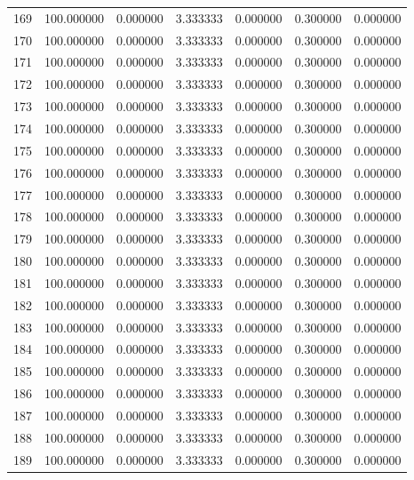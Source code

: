 \begin{tabular}{rrrrrrr}
169 & 100.000000 &    0.000000 &  3.333333 &   0.000000 &   0.300000 &  0.000000 \\
170 & 100.000000 &    0.000000 &  3.333333 &   0.000000 &   0.300000 &  0.000000 \\
171 & 100.000000 &    0.000000 &  3.333333 &   0.000000 &   0.300000 &  0.000000 \\
172 & 100.000000 &    0.000000 &  3.333333 &   0.000000 &   0.300000 &  0.000000 \\
173 & 100.000000 &    0.000000 &  3.333333 &   0.000000 &   0.300000 &  0.000000 \\
174 & 100.000000 &    0.000000 &  3.333333 &   0.000000 &   0.300000 &  0.000000 \\
175 & 100.000000 &    0.000000 &  3.333333 &   0.000000 &   0.300000 &  0.000000 \\
176 & 100.000000 &    0.000000 &  3.333333 &   0.000000 &   0.300000 &  0.000000 \\
177 & 100.000000 &    0.000000 &  3.333333 &   0.000000 &   0.300000 &  0.000000 \\
178 & 100.000000 &    0.000000 &  3.333333 &   0.000000 &   0.300000 &  0.000000 \\
179 & 100.000000 &    0.000000 &  3.333333 &   0.000000 &   0.300000 &  0.000000 \\
180 & 100.000000 &    0.000000 &  3.333333 &   0.000000 &   0.300000 &  0.000000 \\
181 & 100.000000 &    0.000000 &  3.333333 &   0.000000 &   0.300000 &  0.000000 \\
182 & 100.000000 &    0.000000 &  3.333333 &   0.000000 &   0.300000 &  0.000000 \\
183 & 100.000000 &    0.000000 &  3.333333 &   0.000000 &   0.300000 &  0.000000 \\
184 & 100.000000 &    0.000000 &  3.333333 &   0.000000 &   0.300000 &  0.000000 \\
185 & 100.000000 &    0.000000 &  3.333333 &   0.000000 &   0.300000 &  0.000000 \\
186 & 100.000000 &    0.000000 &  3.333333 &   0.000000 &   0.300000 &  0.000000 \\
187 & 100.000000 &    0.000000 &  3.333333 &   0.000000 &   0.300000 &  0.000000 \\
188 & 100.000000 &    0.000000 &  3.333333 &   0.000000 &   0.300000 &  0.000000 \\
189 & 100.000000 &    0.000000 &  3.333333 &   0.000000 &   0.300000 &  0.000000 \\

\end{tabular}
